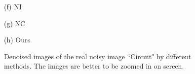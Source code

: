 \documentclass[10pt,onecolumn,letterpaper]{article}
\begin{document}
\begin{figure}[H]
{\begin{minipage}[t]{0.244\textwidth}
{\footnotesize (f) NI \cite{neatimage}  }
\end{minipage}
\begin{minipage}[t]{0.244\textwidth}
\centering
{}
{\footnotesize (g) NC \cite{ncwebsite,noiseclinic}   }
\end{minipage}
\begin{minipage}[t]{0.244\textwidth}
\centering
{}
{\footnotesize (h) Ours  }
\end{minipage}
}
\caption{Denoised images of the real noisy image ``Circuit" \cite{ncwebsite} by different methods. The images are better to be zoomed in on screen.}
\label{fig2}
\end{figure}
\end{document}
